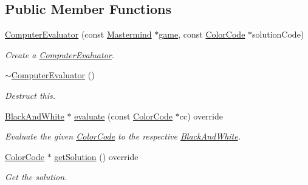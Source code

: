 \subsection*{Public Member Functions}
\begin{DoxyCompactItemize}
\item 
\hyperlink{classmastermind_1_1logic_1_1_computer_evaluator_add62379f02e99740075dadc62f9707c9}{Computer\+Evaluator} (const \hyperlink{classmastermind_1_1logic_1_1_mastermind}{Mastermind} $\ast$\hyperlink{classmastermind_1_1logic_1_1_computer_evaluator_a8801ded4db90b5feae19e6d521738311}{game}, const \hyperlink{classmastermind_1_1logic_1_1_color_code}{Color\+Code} $\ast$solution\+Code)
\begin{DoxyCompactList}\small\item\em Create a \hyperlink{classmastermind_1_1logic_1_1_computer_evaluator}{Computer\+Evaluator}. \end{DoxyCompactList}\item 
\hyperlink{classmastermind_1_1logic_1_1_computer_evaluator_aa216efb1cb2e885562d01b76751c84be}{$\sim$\+Computer\+Evaluator} ()
\begin{DoxyCompactList}\small\item\em Destruct this. \end{DoxyCompactList}\item 
\hyperlink{classmastermind_1_1logic_1_1_black_and_white}{Black\+And\+White} $\ast$ \hyperlink{classmastermind_1_1logic_1_1_computer_evaluator_a65f4a9bafcd5240e0cf92f6398025bd5}{evaluate} (const \hyperlink{classmastermind_1_1logic_1_1_color_code}{Color\+Code} $\ast$cc) override
\begin{DoxyCompactList}\small\item\em Evaluate the given \hyperlink{classmastermind_1_1logic_1_1_color_code}{Color\+Code} to the respective \hyperlink{classmastermind_1_1logic_1_1_black_and_white}{Black\+And\+White}. \end{DoxyCompactList}\item 
\hyperlink{classmastermind_1_1logic_1_1_color_code}{Color\+Code} $\ast$ \hyperlink{classmastermind_1_1logic_1_1_computer_evaluator_ac6e0423a5ef2f6679cfe6be75d3a09dd}{get\+Solution} () override
\begin{DoxyCompactList}\small\item\em Get the solution. \end{DoxyCompactList}\end{DoxyCompactItemize}
